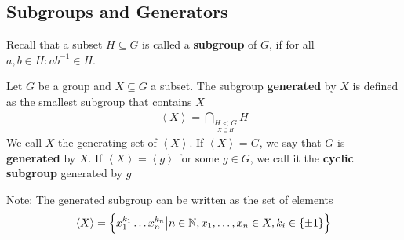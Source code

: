 \subsection{Subgroups and Generators}
Recall that a subset $H \subseteq G$ is called a \textbf{subgroup} of $G$, if for all $a,b \in H: ab^{-1} \in H$.
%
%


\begin{definition}[]
	Let $G$ be a group and $X \subseteq G$ a subset. The subgroup \textbf{generated} by $X$ is defined as the smallest subgroup that contains $X$
	\begin{align*}
		\left<X\right> = \bigcap_{\underset{X \subseteq H}{H < G}}H
	\end{align*}
We call $X$ the generating set of $\left<X\right>$. If $\left<X\right> = G$, we say that $G$ is \textbf{generated} by $X$. If $\left<X\right> = \left<g\right>$ for some $g \in G$, we call it the \textbf{cyclic subgroup} generated by $g$
\end{definition}
Note: The generated subgroup can be written as the set of elements
\begin{align*}
	\left<X\right> = \left\{x_1^{k_1} \ldots x_n^{k_n}\big\vert n \in \mathbb{N}, x_{1}, \ldots, x_{n}\in X, k_i \in \{\pm 1\}\right\}
\end{align*}


